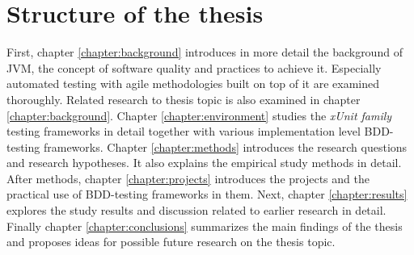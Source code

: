\section{Structure of the thesis}
First, chapter \ref{chapter:background} introduces in more detail the background of JVM, the concept of software quality and practices to achieve it.
Especially automated testing with agile methodologies built on top of it are examined thoroughly. Related research to thesis topic is also
examined in chapter \ref{chapter:background}. Chapter \ref{chapter:environment} studies the \textit{xUnit family} testing frameworks
in detail together with various implementation level BDD-testing frameworks. Chapter \ref{chapter:methods} introduces
the research questions and research hypotheses. It also explains the empirical study methods in detail.
After methods, chapter \ref{chapter:projects} introduces the projects and the practical use of BDD-testing frameworks in them.
Next, chapter \ref{chapter:results} explores the study results and discussion related to earlier research in detail.
Finally chapter \ref{chapter:conclusions} summarizes the main findings of the thesis and proposes ideas for possible
future research on the thesis topic.
